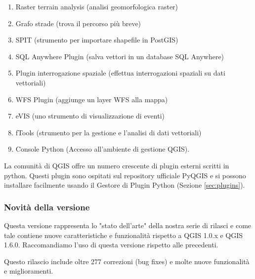 \begin{enumerate}
\item Raster terrain analysis (analisi geomorfologica raster)
\item Grafo strade (trova il percorso più breve)
\item SPIT (strumento per importare shapefile in PostGIS)
\item SQL Anywhere Plugin (salva vettori in un database SQL Anywhere)
\item Plugin interrogazione spaziale (effettua interrogazioni spaziali su dati vettoriali)
\item WFS Plugin (aggiunge un layer WFS alla mappa)
\item eVIS (uno strumento di visualizzazione di eventi)
\item fTools (strumento per la gestione e l'analisi di dati vettoriali)
\item Console Python (Accesso all’ambiente di gestione QGIS).
\end{enumerate}


La comunità di QGIS offre un numero crescente di plugin esterni scritti in python. Questi plugin sono 
ospitati sul repository ufficiale PyQGIS e si possono installare facilmente usando il 
Gestore di Plugin Python (Sezione \ref{sec:plugins}).

\subsubsection{Novità della versione \CURRENT} 

Questa versione rappresenta lo "stato dell'arte" della nostra serie di rilasci e come tale contiene nuove 
caratteristiche e funzionalità rispetto a QGIS 1.0.x e QGIS 1.6.0. 
Raccomandiamo l'uso di questa versione rispetto alle precedenti.

Questo rilascio include oltre 277 correzioni (bug fixes) e molte nuove funzionalità e miglioramenti.  


